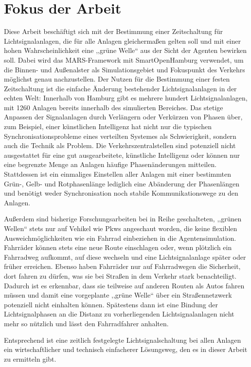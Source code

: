 %
%


\section{Fokus der Arbeit}\label{sec:focus-of-thesis}

Diese Arbeit beschäftigt sich mit der Bestimmung einer Zeitschaltung für Lichtsignalanlagen, die für alle Anlagen gleichermaßen gelten soll und mit einer hohen Wahrscheinlichkeit eine ,,grüne Welle`` aus der Sicht der Agenten bewirken soll.
Dabei wird das MARS-Framework mit SmartOpenHamburg verwendet, um die Binnen- und Außenalster als Simulationsgebiet und Fokuspunkt des Verkehrs möglichst genau nachzustellen.
Der Nutzen für die Bestimmung einer festen Zeitschaltung ist die einfache Änderung bestehender Lichtsignalanlagen in der echten Welt: Innerhalb von Hamburg gibt es mehrere hundert Lichtsignalanlagen, mit 1260 Anlagen bereits innerhalb des simulierten Bereiches.
Das stetige Anpassen der Signalanlagen durch Verlängern oder Verkürzen von Phasen über, zum Beispiel, einer künstlichen Intelligenz hat nicht nur die typischen Synchronisationsprobleme eines verteilten Systemes als Schwierigkeit, sondern auch die Technik als Problem.
Die Verkehrszentralstellen sind potenziell nicht ausgestattet für eine gut ausgearbeitete, künstliche Intelligenz oder können nur eine begrenzte Menge an Anlagen häufige Phasenänderungen mitteilen.
Stattdessen ist ein einmaliges Einstellen aller Anlagen mit einer bestimmten Grün-, Gelb- und Rotphasenlänge lediglich eine Abänderung der Phasenlängen und benötigt weder Synchronisation noch stabile Kommunikationswege zu den Anlagen.

Außerdem sind bisherige Forschungsarbeiten bei in Reihe geschalteten, ,,grünen Wellen`` stets nur auf Vehikel wie Pkws angeschaut worden, die keine flexiblen Ausweichmöglichkeiten wie ein Fahrrad einbeziehen in die Agentensimulation.
Fahrräder können stets eine neue Route einschlagen oder, wenn plötzlich ein Fahrradweg aufkommt, auf diese wechseln und eine Lichtsignalanlage später oder früher erreichen.
Ebenso haben Fahrräder nur auf Fahrradwegen die Sicherheit, dort fahren zu dürfen, was sie bei Straßen in dem Verkehr stark benachteiligt.
Dadurch ist es erkennbar, dass sie teilweise auf anderen Routen als Autos fahren müssen und damit eine vorgeplante ,,grüne Welle`` über ein Straßennetzwerk potenziell nicht einhalten können.
Spätestens dann ist eine Bindung der Lichtsignalphasen an die Distanz zu vorherliegenden Lichtsignalanlagen nicht mehr so nützlich und lässt den Fahrradfahrer anhalten.

Entsprechend ist eine zeitlich festgelegte Lichtsignalschaltung bei allen Anlagen ein wirtschaftlicher und technisch einfacherer Lösungsweg, den es in dieser Arbeit zu ermitteln gibt.
